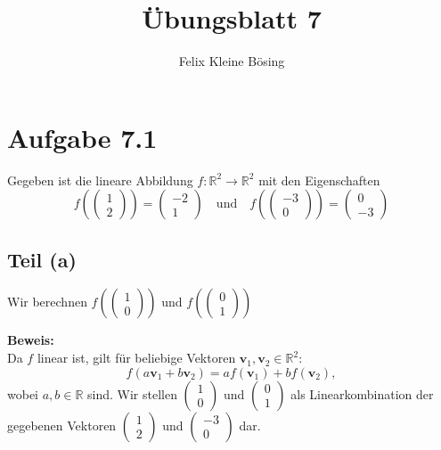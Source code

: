 \documentclass[11pt]{article}
\begin{document}
\title{Übungsblatt 7}
\author{Felix Kleine Bösing}
\maketitle

\section*{Aufgabe 7.1}

Gegeben ist die lineare Abbildung \( f: \mathbb{R}^2 \to \mathbb{R}^2 \) mit den Eigenschaften
\[
f\left(\begin{pmatrix} 1 \\ 2 \end{pmatrix}\right) = \begin{pmatrix} -2 \\ 1 \end{pmatrix} \quad \text{und} \quad
f\left(\begin{pmatrix} -3 \\ 0 \end{pmatrix}\right) = \begin{pmatrix} 0 \\ -3 \end{pmatrix}
\]

\subsection*{Teil (a)}
Wir berechnen \( f\left(\begin{pmatrix} 1 \\ 0 \end{pmatrix}\right) \) und \( f\left(\begin{pmatrix} 0 \\ 1 \end{pmatrix}\right) \)

\textbf{Beweis:} \\
Da \( f \) linear ist, gilt für beliebige Vektoren \( \mathbf{v}_1, \mathbf{v}_2 \in \mathbb{R}^2 \):
\[
f(a \mathbf{v}_1 + b \mathbf{v}_2) = a f(\mathbf{v}_1) + b f(\mathbf{v}_2),
\]
wobei \( a, b \in \mathbb{R} \) sind. Wir stellen \( \begin{pmatrix} 1 \\ 0 \end{pmatrix} \) und \( \begin{pmatrix} 0 \\ 1 \end{pmatrix} \) als Linearkombination der gegebenen Vektoren \( \begin{pmatrix} 1 \\ 2 \end{pmatrix} \) und \( \begin{pmatrix} -3 \\ 0 \end{pmatrix} \) dar.
\end{document}

